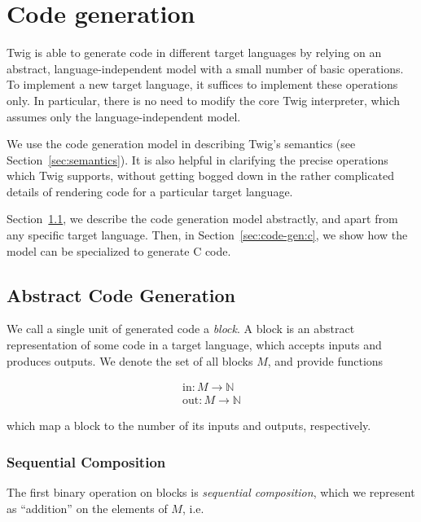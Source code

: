 
\section{Code generation}
\label{sec:code-gen}

Twig is able to generate code in different target languages by
relying on an abstract, language-independent model with a small
number of basic operations. To implement a new target language, it
suffices to implement these operations only. In particular, there
is no need to modify the core Twig interpreter, which assumes only
the language-independent model.

We use the code generation model in describing Twig's semantics
(see Section~\ref{sec:semantics}). It is also helpful in
clarifying the precise operations which Twig supports, without
getting bogged down in the rather complicated details of rendering
code for a particular target language.

Section~\ref{sec:code-gen:abstract}, we describe the code
generation model abstractly, and apart from any specific target
language. Then, in Section~\ref{sec:code-gen:c}, we show how the
model can be specialized to generate C code.

\subsection{Abstract Code Generation}
\label{sec:code-gen:abstract}

We call a single unit of generated code a \emph{block}. A block is
an abstract representation of some code in a target language,
which accepts inputs and produces outputs. We denote the 
set of all blocks $M$, and provide functions 

\begin{eqnarray*}
\mbox{in} : M \to \mathbb{N}\\
\mbox{out} : M \to \mathbb{N}
\end{eqnarray*}

which map a block to the number of its inputs and outputs,
respectively.

\subsubsection{Sequential Composition}
\label{sec:code-gen:seq}

The first binary operation on blocks is \emph{sequential
composition}, which we represent as ``addition'' on the elements
of $M$, i.e.

